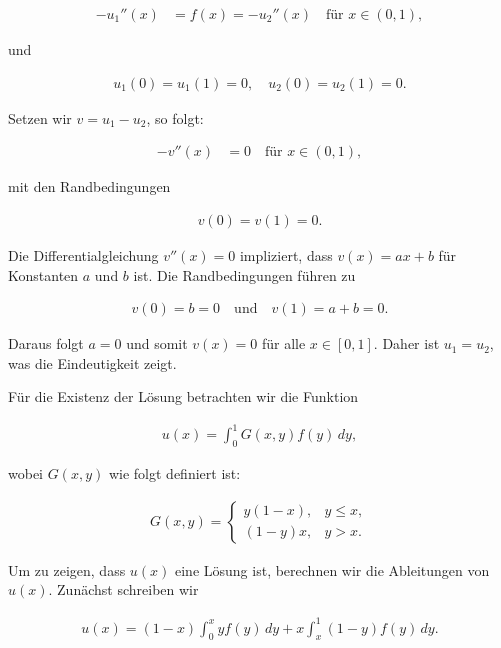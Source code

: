 \documentclass[11pt,a4paper]{article}
\begin{document}
\begin{align*}
-u_1''(x) &= f(x) = -u_2''(x) \quad \text{für } x \in (0,1),
\end{align*}

und

\begin{align*}
u_1(0) = u_1(1) = 0, \quad u_2(0) = u_2(1) = 0.
\end{align*}

Setzen wir \( v = u_1 - u_2 \), so folgt:

\begin{align*}
-v''(x) &= 0 \quad \text{für } x \in (0,1),
\end{align*}

mit den Randbedingungen

\begin{align*}
v(0) = v(1) = 0.
\end{align*}

Die Differentialgleichung \( v''(x) = 0 \) impliziert, dass \( v(x) = ax + b \) für Konstanten \( a \) und \( b \) ist. Die Randbedingungen führen zu

\begin{align*}
v(0) = b = 0 \quad \text{und} \quad v(1) = a + b = 0.
\end{align*}

Daraus folgt \( a = 0 \) und somit \( v(x) = 0 \) für alle \( x \in [0,1] \). Daher ist \( u_1 = u_2 \), was die Eindeutigkeit zeigt.

Für die Existenz der Lösung betrachten wir die Funktion

\begin{align*}
u(x) = \int_0^1 G(x, y) f(y) \, dy,
\end{align*}

wobei \( G(x, y) \) wie folgt definiert ist:

\begin{align*}
G(x, y) = 
\begin{cases} 
y(1-x), & y \leq x, \\ 
(1-y)x, & y > x.
\end{cases}
\end{align*}

Um zu zeigen, dass \( u(x) \) eine Lösung ist, berechnen wir die Ableitungen von \( u(x) \). Zunächst schreiben wir

\begin{align*}
u(x) = (1-x) \int_0^x y f(y) \, dy + x \int_x^1 (1-y) f(y) \, dy.
\end{align*}
\end{document}
